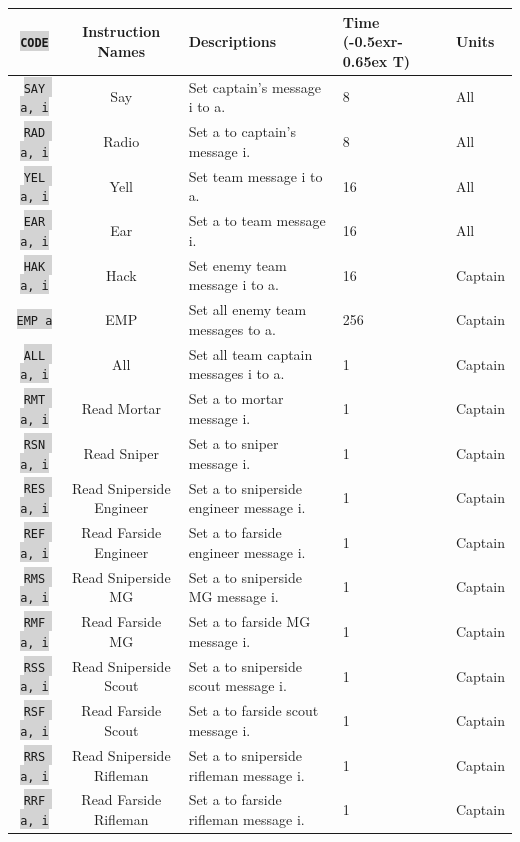 \documentclass{article}
\newcommand{\vnscode}[1]{\colorbox{lightgray}{\lstinline[language=vns]{#1}}}
\newcommand{\RT}{\lower-0.5ex\hbox{r}\kern-0.65ex T}
\begin{document}
\begin{minipage}{\textwidth}
\label{table:communication}
\centering
\begin{tabular}{|c|c|l|l|l|}
    \hline \vnscode{CODE} & Instruction Names & Descriptions & Time (\RT) & Units \\ \hline
    \vnscode{SAY a, i} & Say & Set captain's message i to a. & 8 & All \\ \hline
    \vnscode{RAD a, i} & Radio & Set a to captain's message i. & 8 & All \\ \hline
    \vnscode{YEL a, i} & Yell & Set team message i to a. & 16 & All \\ \hline
    \vnscode{EAR a, i} & Ear & Set a to team message i. & 16 & All \\ \hline
    \vnscode{HAK a, i} & Hack & Set enemy team message i to a. & 16 & Captain \\ \hline
    \vnscode{EMP a} & EMP & Set all enemy team messages to a. & 256 & Captain \\ \hline
    \vnscode{ALL a, i} & All & Set all team captain messages i to a. & 1 & Captain \\ \hline
    \vnscode{RMT a, i} & Read Mortar & Set a to mortar message i. & 1 & Captain \\ \hline
    \vnscode{RSN a, i} & Read Sniper & Set a to sniper message i. & 1 & Captain \\ \hline
    \vnscode{RES a, i} & Read Sniperside Engineer & Set a to sniperside engineer message i. & 1 & Captain \\ \hline
    \vnscode{REF a, i} & Read Farside Engineer & Set a to farside engineer message i. & 1 & Captain \\ \hline
    \vnscode{RMS a, i} & Read Sniperside MG & Set a to sniperside MG message i. & 1 & Captain \\ \hline
    \vnscode{RMF a, i} & Read Farside MG & Set a to farside MG message i. & 1 & Captain \\ \hline
    \vnscode{RSS a, i} & Read Sniperside Scout & Set a to sniperside scout message i. & 1 & Captain \\ \hline
    \vnscode{RSF a, i} & Read Farside Scout & Set a to farside scout message i. & 1 & Captain \\ \hline
    \vnscode{RRS a, i} & Read Sniperside Rifleman & Set a to sniperside rifleman message i. & 1 & Captain \\ \hline
    \vnscode{RRF a, i} & Read Farside Rifleman & Set a to farside rifleman message i. & 1 & Captain \\ \hline

\end{tabular}
\end{minipage}
\end{document}
